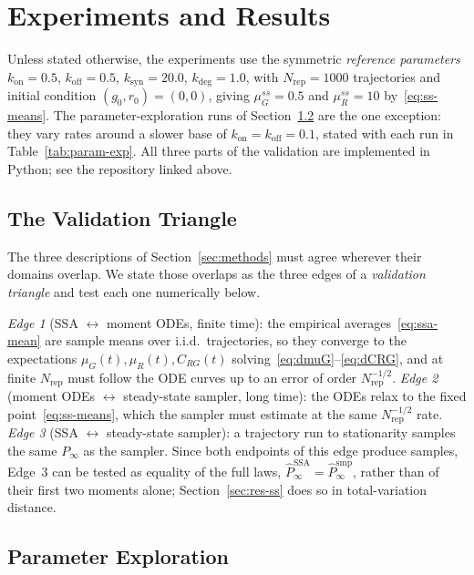 \documentclass[11pt]{article}
\newcommand{\muG}{\mu_G}
\newcommand{\muR}{\mu_R}
\newcommand{\CRG}{C_{RG}}
\newcommand{\kon}{k_{\mathrm{on}}}
\newcommand{\koff}{k_{\mathrm{off}}}
\newcommand{\ksyn}{k_{\mathrm{syn}}}
\newcommand{\kdeg}{k_{\mathrm{deg}}}
\begin{document}
\section{Experiments and Results}
\label{sec:results}

Unless stated otherwise, the experiments use the symmetric \emph{reference parameters}
$\kon=0.5$, $\koff=0.5$, $\ksyn=20.0$, $\kdeg=1.0$, with $N_{\mathrm{rep}}=1000$ trajectories and initial condition
$(g_0,r_0)=(0,0)$, giving $\muG^{ss}=0.5$ and $\muR^{ss}=10$ by~\eqref{eq:ss-means}.
The parameter-exploration runs of Section~\ref{sec:res-explore} are the one exception: they
vary rates around a slower base of $\kon=\koff=0.1$, stated with each run in
Table~\ref{tab:param-exp}.
All three parts of the validation are implemented in Python; see the repository linked above.

\subsection{The Validation Triangle}
\label{sec:intersection}

The three descriptions of Section~\ref{sec:methods} must agree wherever their domains overlap. We state
those overlaps as the three edges of a \emph{validation triangle} and test each one numerically below.

\emph{Edge 1} (SSA $\leftrightarrow$ moment ODEs, finite time): the empirical
averages~\eqref{eq:ssa-mean} are sample means over i.i.d.\ trajectories, so they converge to the
expectations $\muG(t),\muR(t),\CRG(t)$ solving~\eqref{eq:dmuG}--\eqref{eq:dCRG}, and at finite
$N_{\mathrm{rep}}$ must follow the ODE curves up to an error of order $N_{\mathrm{rep}}^{-1/2}$.
\emph{Edge 2} (moment ODEs $\leftrightarrow$ steady-state sampler, long time): the ODEs relax to the
fixed point~\eqref{eq:ss-means}, which the sampler must estimate at the same $N_{\mathrm{rep}}^{-1/2}$
rate. \emph{Edge 3} (SSA $\leftrightarrow$ steady-state sampler): a trajectory run to stationarity
samples the same $P_\infty$ as the sampler. Since both endpoints of this edge produce samples, Edge~3
can be tested as equality of the full laws, $\hat P^{\mathrm{SSA}}_\infty=\hat P^{\mathrm{smp}}_\infty$,
rather than of their first two moments alone; Section~\ref{sec:res-ss} does so in total-variation
distance.

\subsection{Parameter Exploration}
\label{sec:res-explore}
\end{document}
